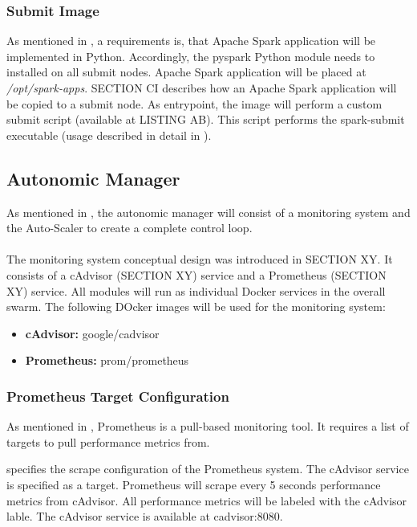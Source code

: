 \subsubsection{Submit Image}
As mentioned in , a requirements is, that Apache Spark application will be implemented in Python. Accordingly, the pyspark Python module needs to installed on all submit nodes.
Apache Spark application will be placed at \textit{/opt/spark-apps}. SECTION CI describes how an Apache Spark application will be copied to a submit node.
As entrypoint, the image will perform a custom submit script (available at LISTING AB). This script performs the spark-submit executable (usage described in detail in ).


\subsection{Autonomic Manager}
As mentioned in , the autonomic manager will consist of a monitoring system and the Auto-Scaler to create a complete control loop.

\paragraph{}The monitoring system conceptual design was introduced in SECTION XY.
It consists of a cAdvisor (SECTION XY) service and a Prometheus (SECTION XY) service.
All modules will run as individual Docker services in the overall swarm.
The following DOcker images will be used for the monitoring system:
\begin{itemize}
\item \textbf{cAdvisor:} google/cadvisor
\item \textbf{Prometheus:} prom/prometheus
\end{itemize}

\subsubsection{Prometheus Target Configuration}
As mentioned in , Prometheus is a pull-based monitoring tool.
It requires a list of targets to pull performance metrics from.


 specifies the scrape configuration of the Prometheus system.
The cAdvisor service is specified as a target. Prometheus will scrape every 5 seconds performance metrics from cAdvisor. All performance metrics will be labeled with the cAdvisor lable. The cAdvisor service is available at  cadvisor:8080.


